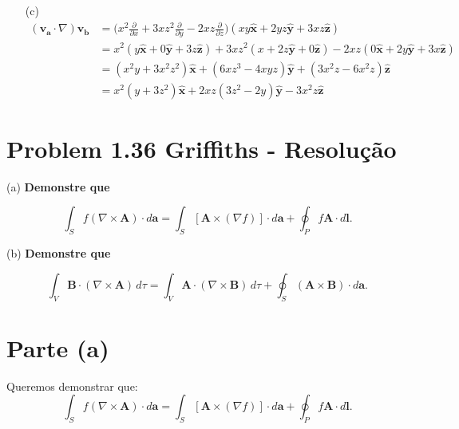\documentclass[a4paper,12pt]{article}
\begin{document}
\begin{enumerate}
    \item[(c)]
    \begin{align}
        (\mathbf{v_a} \cdot \nabla) \mathbf{v_b} &= \Big(x^2 \frac{\partial}{\partial x} + 3x z^2 \frac{\partial}{\partial y} - 2xz \frac{\partial}{\partial z}\Big) (xy \hat{\mathbf{x}} + 2yz \hat{\mathbf{y}} + 3xz \hat{\mathbf{z}})\\
        &= x^2 (y \hat{\mathbf{x}} + 0 \hat{\mathbf{y}} + 3z \hat{\mathbf{z}}) + 3x z^2 (x + 2z \hat{\mathbf{y}} + 0 \hat{\mathbf{z}}) - 2xz (0 \hat{\mathbf{x}} + 2y \hat{\mathbf{y}} + 3x \hat{\mathbf{z}})\\
        &= (x^2 y + 3x^2 z^2) \hat{\mathbf{x}} + (6xz^3 - 4xyz) \hat{\mathbf{y}} + (3x^2 z - 6x^2 z) \hat{\mathbf{z}}\\
        &= \boxed{x^2 (y + 3z^2)\hat{\mathbf{x}} + 2xz (3z^2 - 2y) \hat{\mathbf{y}} - 3x^2 z \hat{\mathbf{z}}}
        \end{align}

\end{enumerate}
\section*{Problem 1.36 Griffiths - Resolu\c{c}\~ao}

(a) \textbf{Demonstre que}

\begin{equation}
\int_S f (\nabla \times \mathbf{A}) \cdot d\mathbf{a} =
\int_S [\mathbf{A} \times (\nabla f)] \cdot d\mathbf{a} + \oint_P f \mathbf{A} \cdot d\mathbf{l}.
\end{equation}

\hspace{-0.65cm}(b) \textbf{Demonstre que}

\begin{equation}
\int_V \mathbf{B} \cdot (\nabla \times \mathbf{A}) \, d\tau =
\int_V \mathbf{A} \cdot (\nabla \times \mathbf{B}) \, d\tau +
\oint_S (\mathbf{A} \times \mathbf{B}) \cdot d\mathbf{a}.
\end{equation}

\section*{Parte (a)}

Queremos demonstrar que:
\begin{equation}
\int_S f (\nabla \times \mathbf{A}) \cdot d\mathbf{a} =
\int_S [\mathbf{A} \times (\nabla f)] \cdot d\mathbf{a} + \oint_P f \mathbf{A} \cdot d\mathbf{l}.
\end{equation}
\end{document}
